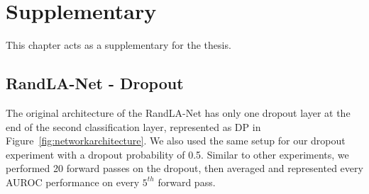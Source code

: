 


    \chapter{Supplementary}
    This chapter acts as a supplementary for the thesis.
    \section{RandLA-Net - Dropout}
    \label{sec:randladout}
    The original architecture of the RandLA-Net has only one dropout layer at the end of the second classification layer, represented as DP in Figure~\ref{fig:networkarchitecture}.
    We also used the same setup for our dropout experiment with a dropout probability of 0.5.
    Similar to other experiments, we performed 20 forward passes on the dropout, then averaged and represented every AUROC performance on every $5^{th}$ forward pass.
